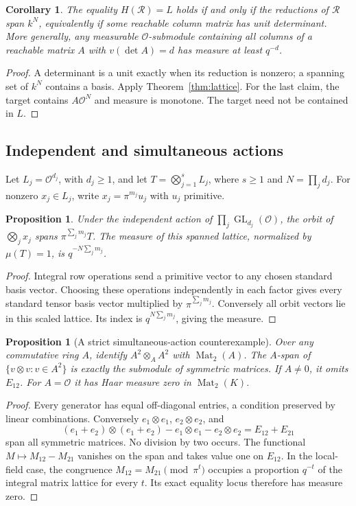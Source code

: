 \documentclass[11pt]{amsart}
\newtheorem{proposition}[theorem]{Proposition}
\newtheorem{corollary}[theorem]{Corollary}
\theoremstyle{definition}
\theoremstyle{remark}
\newcommand{\OO}{\mathcal O}
\newcommand{\GL}{\operatorname{GL}}
\newcommand{\Mat}{\operatorname{Mat}}
\begin{document}
\begin{corollary}\label{cor:residue}
The equality $H(\mathcal R)=L$ holds if and only if the reductions of
$\mathcal R$ span $k^N$, equivalently if some reachable column matrix has
unit determinant. More generally, any measurable $\OO$-submodule containing
all columns of a reachable matrix $A$ with $v(\det A)=d$ has measure at least
$q^{-d}$.
\end{corollary}
\begin{proof}
A determinant is a unit exactly when its reduction is nonzero; a spanning
set of $k^N$ contains a basis. Apply Theorem~\ref{thm:lattice}.
For the last claim, the target contains $A\OO^N$ and measure is monotone.
The target need not be contained in $L$.
\end{proof}

\subsection{Independent and simultaneous actions}
Let $L_j=\OO^{d_j}$, with $d_j\ge1$, and let
$T=\bigotimes_{j=1}^s L_j$, where $s\ge1$ and
$N=\prod_jd_j$. For nonzero $x_j\in L_j$, write
$x_j=\pi^{m_j}u_j$ with $u_j$ primitive.

\begin{proposition}\label{prop:independent}
Under the independent action of $\prod_j\GL_{d_j}(\OO)$,
the orbit of $\bigotimes_jx_j$ spans
$\pi^{\sum_jm_j}T$. The measure of this spanned lattice, normalized by
$\mu(T)=1$, is
$q^{-N\sum_jm_j}$.
\end{proposition}
\begin{proof}
Integral row operations send a primitive vector to any chosen standard
basis vector. Choosing these operations independently in each factor gives
every standard tensor basis vector multiplied by $\pi^{\sum_jm_j}$.
Conversely all orbit vectors lie in this scaled lattice.
Its index is $q^{N\sum_jm_j}$, giving the measure.
\end{proof}

\begin{proposition}[A strict simultaneous-action counterexample]\label{prop:diagonal}
Over any commutative ring $A$, identify $A^2\otimes_AA^2$ with
$\Mat_2(A)$. The $A$-span of $\{v\otimes v:v\in A^2\}$ is exactly
the submodule of symmetric matrices. If $A\ne0$, it omits $E_{12}$.
For $A=\OO$ it has Haar measure zero in $\Mat_2(K)$.
\end{proposition}
\begin{proof}
Every generator has equal off-diagonal entries, a condition preserved by
linear combinations. Conversely $e_1\otimes e_1$, $e_2\otimes e_2$, and
\[
 (e_1+e_2)\otimes(e_1+e_2)-e_1\otimes e_1-e_2\otimes e_2
 =E_{12}+E_{21}
\]
span all symmetric matrices. No division by two occurs.
The functional $M\mapsto M_{12}-M_{21}$ vanishes on the span and takes
value one on $E_{12}$. In the local-field case, the congruence
$M_{12}=M_{21}\pmod{\pi^t}$ occupies a proportion $q^{-t}$ of the
integral matrix lattice for every $t$. Its exact equality locus therefore
has measure zero.
\end{proof}
\end{document}
